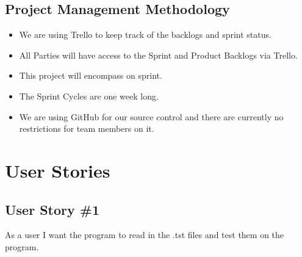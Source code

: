 \subsection{Project  Management Methodology}
 
\begin{itemize}
\item We are using Trello to keep track of the backlogs and sprint status.%
\item All Parties will have access to the Sprint and Product Backlogs via Trello.%
\item This project will encompass on sprint.%
\item The Sprint Cycles are one week long.%
\item We are using GitHub for our source control and there are currently no restrictions for team members on it.%
\end{itemize}

\section{User Stories}




\subsection{User Story \#1}
As a user I want the program to read in the .tst files and test them on the program.

